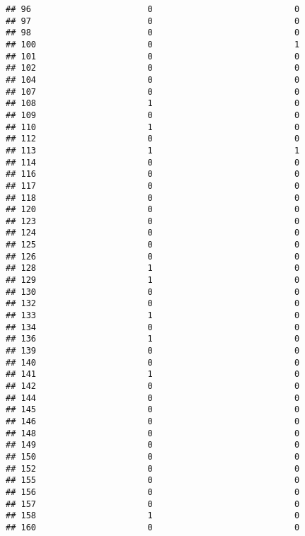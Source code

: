 \documentclass[
]{article}
\begin{document}
\begin{verbatim}
## 96                       0                            0
## 97                       0                            0
## 98                       0                            0
## 100                      0                            1
## 101                      0                            0
## 102                      0                            0
## 104                      0                            0
## 107                      0                            0
## 108                      1                            0
## 109                      0                            0
## 110                      1                            0
## 112                      0                            0
## 113                      1                            1
## 114                      0                            0
## 116                      0                            0
## 117                      0                            0
## 118                      0                            0
## 120                      0                            0
## 123                      0                            0
## 124                      0                            0
## 125                      0                            0
## 126                      0                            0
## 128                      1                            0
## 129                      1                            0
## 130                      0                            0
## 132                      0                            0
## 133                      1                            0
## 134                      0                            0
## 136                      1                            0
## 139                      0                            0
## 140                      0                            0
## 141                      1                            0
## 142                      0                            0
## 144                      0                            0
## 145                      0                            0
## 146                      0                            0
## 148                      0                            0
## 149                      0                            0
## 150                      0                            0
## 152                      0                            0
## 155                      0                            0
## 156                      0                            0
## 157                      0                            0
## 158                      1                            0
## 160                      0                            0

\end{verbatim}
\end{document}
